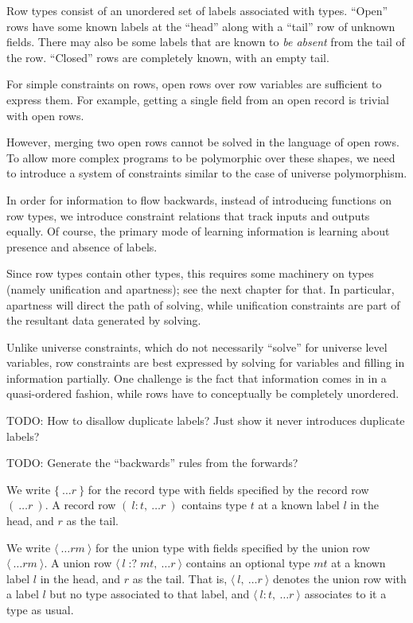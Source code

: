 \documentclass[11pt, twoside, reqno]{book}
\providecommand{\lcurvyangle}{\langle}
\providecommand{\rcurvyangle}{\rangle}
\begin{document}
Row types consist of an unordered set of labels associated with types.
``Open'' rows have some known labels at the ``head'' along with a ``tail'' row of unknown fields.
There may also be some labels that are known to \emph{be absent} from the tail of the row.
``Closed'' rows are completely known, with an empty tail.

For simple constraints on rows, open rows over row variables are sufficient to express them.
For example, getting a single field from an open record is trivial with open rows.

However, merging two open rows cannot be solved in the language of open rows.
To allow more complex programs to be polymorphic over these shapes, we need to introduce a system of constraints similar to the case of universe polymorphism.

In order for information to flow backwards, instead of introducing functions on row types, we introduce constraint relations that track inputs and outputs equally.
Of course, the primary mode of learning information is learning about presence and absence of labels.

Since row types contain other types, this requires some machinery on types (namely unification and apartness); see the next chapter for that.
In particular, apartness will direct the path of solving, while unification constraints are part of the resultant data generated by solving.

Unlike universe constraints, which do not necessarily “solve” for universe level variables, row constraints are best expressed by solving for variables and filling in information partially.
One challenge is the fact that information comes in in a quasi-ordered fashion, while rows have to conceptually be completely unordered.

TODO: How to disallow duplicate labels?
Just show it never introduces duplicate labels?

TODO: Generate the ``backwards'' rules from the forwards?

We write \(\{\ \dots\!r\ \}\) for the record type with fields specified by the record row \((\ \dots\!r\ )\).
A record row \((\ l : t,\ \dots\!r\ )\) contains type \(t\) at a known label \(l\) in the head, and \(r\) as the tail.

We write \(\langle\ \dots\!\mathit{rm}\ \rangle\) for the union type with fields specified by the union row \(\lcurvyangle\ \dots\!\mathit{rm}\ \rcurvyangle\).
A union row $\lcurvyangle\ l \mathop{{:}{?}} \mathit{mt},\ \dots\!r\ \rcurvyangle$ contains an optional type \(\mathit{mt}\) at a known label \(l\) in the head, and \(r\) as the tail.
That is, \(\lcurvyangle\ l,\ \dots\!r\ \rcurvyangle\) denotes the union row with a label \(l\) but no type associated to that label, and \(\lcurvyangle\ l : t,\ \dots\!r\ \rcurvyangle\) associates to it a type as usual.
\end{document}
